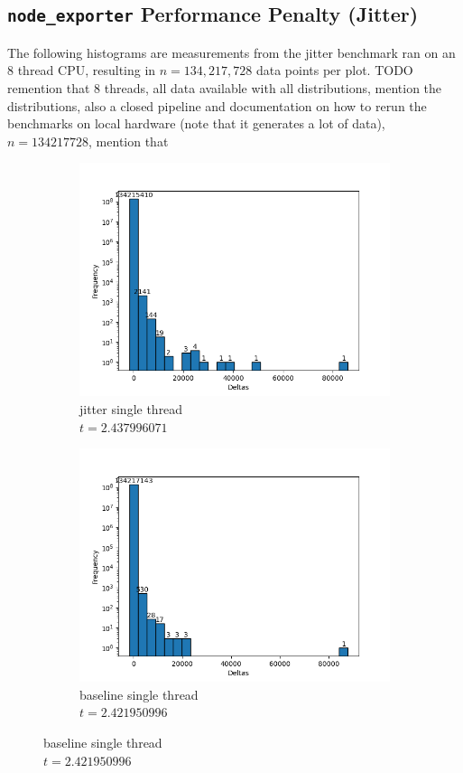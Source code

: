 \subsection{\texttt{node\_exporter} Performance Penalty (Jitter)}
The following histograms are measurements from the jitter benchmark ran on an 8 thread CPU, resulting in $n=134,217,728$ data points per plot.
TODO remention that 8 threads, all data available with all distributions, mention the distributions, also a closed pipeline and documentation on how to rerun the benchmarks on local hardware (note that it generates a lot of data), $n=134217728$, mention that 
\begin{figure}[H]
\centering
\begin{subfigure}{.42\textwidth}
  \centering
  \includegraphics[width=\textwidth]{./plots_jitter/jitter/output_size_1_rank_0_25.png}
  \caption{jitter single thread\\$t=2.437996071$}
\end{subfigure}%
\begin{subfigure}{.42\textwidth}
  \centering
  \includegraphics[width=\textwidth]{./plots_jitter/jitter_baseline/output_size_1_rank_0_25.png}
  \caption{baseline single thread\\$t=2.421950996$}
\end{subfigure}


\end{figure}
